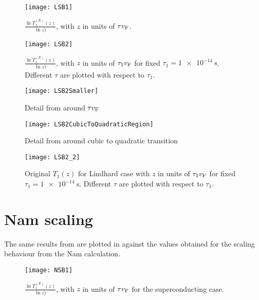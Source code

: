 \documentclass[../main.tex]{subfiles}
\begin{document}
	\begin{figure}[htp]
		\centering
		\texttt{[image: LSB1]}
		\caption{$\frac{\ln{T_{1}^{(E)}(z)}}{\ln{z})}$, with $z$ in units of $\tau v_{\mathrm{F}}$.}\label{fig:lsb:scale1}
	\end{figure}

	\begin{figure}[htp]
		\centering
		\texttt{[image: LSB2]}
		\caption{$\frac{\ln{T_{1}^{(E)}(z)}}{\ln{z})}$, with $z$ in units of $\tau_1 v_{\mathrm{F}}$ for fixed $\tau_1=\SI{1e-14}{\second}$.
		Different $\tau$ are plotted with respect to $\tau_1$.}\label{fig:lsb:scale2}
	\end{figure}

	\begin{figure}[htp]
		\centering
		\texttt{[image: LSB2Smaller]}
		\caption{Detail from  around $\tau v_{\mathrm{F}}$}\label{fig:lsb:scaleInflection1}
	\end{figure}

	\begin{figure}[htp]
		\centering
		\texttt{[image: LSB2CubicToQuadraticRegion]}
		\caption{Detail from  around cubic to quadratic transition}\label{fig:lsb:scaleInflection2}
	\end{figure}

	\begin{figure}[htp]
		\centering
		\texttt{[image: LSB2\_2]}
		\caption{Original $T_1(z)$ for Lindhard case with $z$ in units of $\tau_1 v_{\mathrm{F}}$ for fixed $\tau_1=\SI{1e-14}{\second}$.
		Different $\tau$ are plotted with respect to $\tau_1$.}\label{fig:lsb:scale2.2}
	\end{figure}

	\section{Nam scaling} \label{sec:lsb:nam}

	The same results from  are plotted in  against the values obtained for the scaling behaviour from the Nam calculation.

	\begin{figure}[htp]
		\centering
		\texttt{[image: NSB1]}
		\caption{$\frac{\ln{T_{1}^{(E)}(z)}}{\ln{z})}$, with $z$ in units of $\tau v_{\mathrm{F}}$ for the superconducting case.}\label{fig:nsb:scale1}
	\end{figure}
\end{document}
